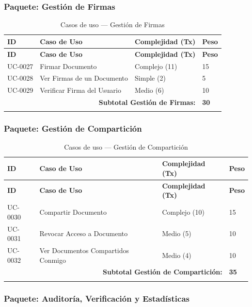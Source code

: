 \documentclass[11pt, a4paper]{article}
\begin{document}
\subsubsection*{Paquete: Gestión de Firmas}

\begin{longtable}{|p{1.8cm}|p{6.5cm}|p{3cm}|p{1.5cm}|}
\hline
\textbf{ID} & \textbf{Caso de Uso} & \textbf{Complejidad (Tx)} & \textbf{Peso} \\
\hline
\endfirsthead
\hline
\textbf{ID} & \textbf{Caso de Uso} & \textbf{Complejidad (Tx)} & \textbf{Peso} \\
\hline
\endhead
UC-0027 & Firmar Documento & Complejo (11) & 15 \\
\hline
UC-0028 & Ver Firmas de un Documento & Simple (2) & 5 \\
\hline
UC-0029 & Verificar Firma del Usuario & Medio (6) & 10 \\
\hline
\multicolumn{3}{|r|}{\textbf{Subtotal Gestión de Firmas:}} & \textbf{30} \\
\hline
\caption{Casos de uso --- Gestión de Firmas}\label{tab:uc-firmas}
\end{longtable}

\subsubsection*{Paquete: Gestión de Compartición}

\begin{longtable}{|p{1.8cm}|p{6.5cm}|p{3cm}|p{1.5cm}|}
\hline
\textbf{ID} & \textbf{Caso de Uso} & \textbf{Complejidad (Tx)} & \textbf{Peso} \\
\hline
\endfirsthead
\hline
\textbf{ID} & \textbf{Caso de Uso} & \textbf{Complejidad (Tx)} & \textbf{Peso} \\
\hline
\endhead
UC-0030 & Compartir Documento & Complejo (10) & 15 \\
\hline
UC-0031 & Revocar Acceso a Documento & Medio (5) & 10 \\
\hline
UC-0032 & Ver Documentos Compartidos Conmigo & Medio (4) & 10 \\
\hline
\multicolumn{3}{|r|}{\textbf{Subtotal Gestión de Compartición:}} & \textbf{35} \\
\hline
\caption{Casos de uso --- Gestión de Compartición}\label{tab:uc-comparticion}
\end{longtable}

\subsubsection*{Paquete: Auditoría, Verificación y Estadísticas}
\end{document}
